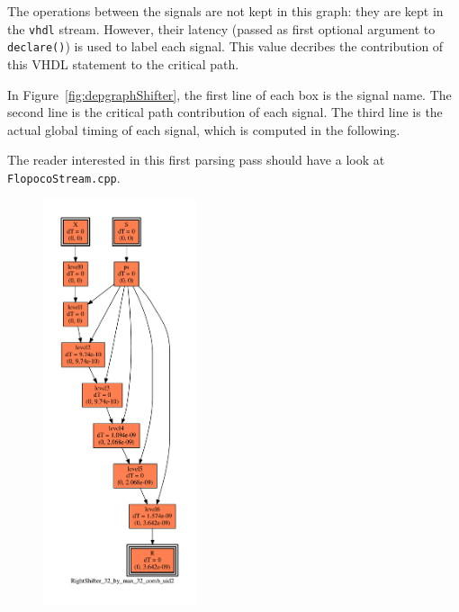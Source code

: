 \documentclass{article}
\begin{document}
The operations between the signals are not kept in this graph: they are kept in the \texttt{vhdl} stream.
  However, their latency (passed as first optional argument to  \texttt{declare()}) is used to label each signal.
  This value decribes the contribution of this VHDL statement to the critical path.

  In Figure~\ref{fig:depgraphShifter}, the first line of each box is the signal name.
The second line is the critical path contribution of each signal.
  The third line is the actual global timing of each signal, which is computed in the following. 
  
The reader interested in this first parsing pass should have a look at \texttt{FlopocoStream.cpp}.

  \begin{figure}
    \includegraphics[width=0.4\textwidth]{Fig/depgraphShifterNoPipe}
    \hfill

\end{figure}
\end{document}
